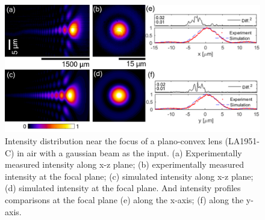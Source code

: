 \documentclass[9pt,twocolumn,twoside]{osajnl}
\begin{document}
\begin{figure}
	\centering
	\includegraphics[width=\linewidth]{../AppOptics/figures/LA1951air.pdf}
	\caption{Intensity distribution near the focus of a plano-convex lens (LA1951-C) in air with a gaussian beam as the input. (a) Experimentally measured intensity along x-z plane; (b) experimentally measured intensity at the focal plane; (c) simulated intensity along x-z plane; (d) simulated intensity at the focal plane. And intensity profiles comparisons at the focal plane (e) along the x-axis; (f) along the y-axis.}\label{fig:3}
\end{figure}
\end{document}
